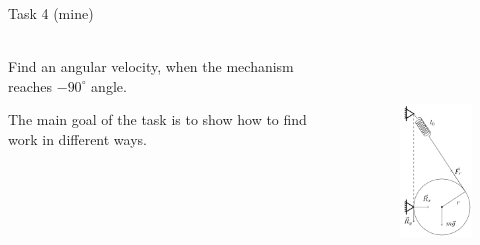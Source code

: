 \documentclass[aspectratio=169]{beamer}
\newcommand{\fbckg}[1]{\usebackgroundtemplate{\texttt{[image: \#1]}}}%
\begin{document}
\begin{frame}[t]{Task 4 (mine)
    }
\framesubtitle{}
\begin{columns}[T,onlytextwidth]
    \begin{column}{0.59\textwidth}
        Find an angular velocity, when the mechanism reaches $-90^\circ$ angle.
        \medskip

        The main goal of the task is to show how to find work in different ways.
    \end{column}
    \begin{column}{0.39\textwidth}
        \vspace{-0.6cm}
        \begin{figure}[H]
            \centering\includegraphics[height=6cm,width=1\textwidth,keepaspectratio]{image16.png}
            \label{fig:image16}
        \end{figure}
    \end{column}
\end{columns}
\end{frame}

\fbckg{fibeamer/figs/last_page.png}
\frame[plain]{}
\end{document}
